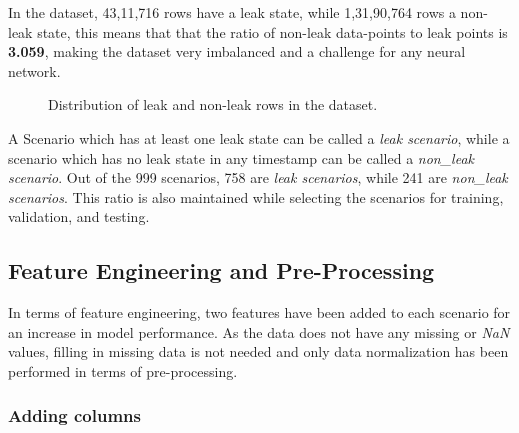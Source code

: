 \documentclass[final,5p,times,twocolumn,authoryear]{elsarticle}
\begin{document}
In the dataset, 43,11,716 rows have a leak state, while 1,31,90,764 rows a non-leak state, this means that that the ratio of non-leak data-points to leak points is \textbf{3.059}, making the dataset very imbalanced and a challenge for any neural network.

\begin{figure}[H]
\centering
{}
\caption{Distribution of leak and non-leak rows in the dataset.}
\label{fig:leak_distribution}
\end{figure}

A Scenario which has at least one leak state can be called a \textit{leak scenario}, while a scenario which has no leak state in any timestamp can be called a \textit{non\_leak scenario}. Out of the 999 scenarios, 758 are \textit{leak scenarios}, while 241 are \textit{non\_leak scenarios}. This ratio is also maintained while selecting the scenarios for training, validation, and testing.

\subsection{Feature Engineering and Pre-Processing}

In terms of feature engineering, two features have been added to each scenario for an increase in model performance. As the data does not have any missing or \textit{NaN} values, filling in missing data is not needed and only data normalization has been performed in terms of pre-processing.

\subsubsection{Adding columns}
\end{document}

